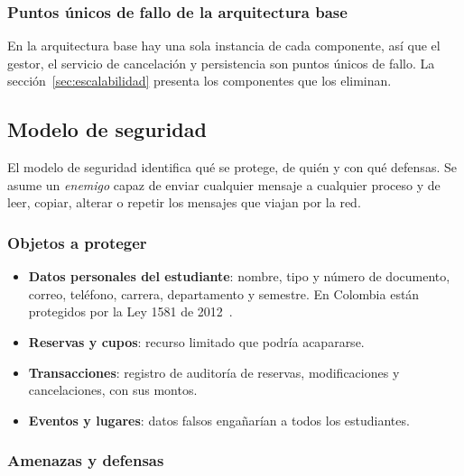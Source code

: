 \subsubsection{Puntos únicos de fallo de la arquitectura base}

En la arquitectura base hay una sola instancia de cada componente, así que el
gestor, el servicio de cancelación y persistencia son puntos únicos de fallo. La
sección~\ref{sec:escalabilidad} presenta los componentes que los eliminan.

\subsection{Modelo de seguridad}

El modelo de seguridad identifica qué se protege, de quién y con qué defensas. Se
asume un \emph{enemigo} capaz de enviar cualquier mensaje a cualquier proceso y de
leer, copiar, alterar o repetir los mensajes que viajan por la red.

\subsubsection{Objetos a proteger}

\begin{itemize}
    \item \textbf{Datos personales del estudiante}: nombre, tipo y número de
          documento, correo, teléfono, carrera, departamento y semestre. En Colombia
          están protegidos por la Ley 1581 de 2012~\cite{ley1581}.
    \item \textbf{Reservas y cupos}: recurso limitado que podría acapararse.
    \item \textbf{Transacciones}: registro de auditoría de reservas, modificaciones y
          cancelaciones, con sus montos.
    \item \textbf{Eventos y lugares}: datos falsos engañarían a todos los estudiantes.
\end{itemize}

\subsubsection{Amenazas y defensas}

